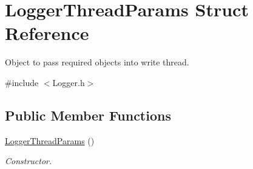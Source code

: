 \hypertarget{struct_logger_thread_params}{
\section{LoggerThreadParams Struct Reference}
\label{struct_logger_thread_params}
}


Object to pass required objects into write thread.  




{\ttfamily \#include $<$Logger.h$>$}

\subsection*{Public Member Functions}
\begin{DoxyCompactItemize}
\item 
\hypertarget{struct_logger_thread_params_aef76fe61447882120fbb25e02f9d03f8}{
\hyperlink{struct_logger_thread_params_aef76fe61447882120fbb25e02f9d03f8}{LoggerThreadParams} ()}
\label{struct_logger_thread_params_aef76fe61447882120fbb25e02f9d03f8}

\begin{DoxyCompactList}\small\item\em Constructor. \end{DoxyCompactList}\end{DoxyCompactItemize}
